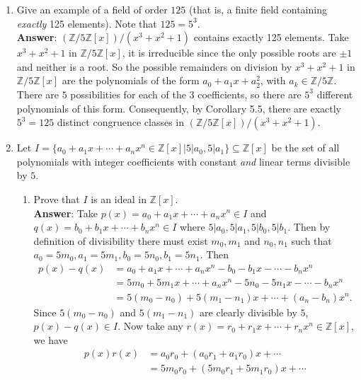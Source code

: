 \documentclass{article}
\begin{document}
\begin{enumerate}
\begin{enumerate}
            \end{enumerate}
      \item Give an example of a field of order $125$ (that is, a finite field containing \textit{exactly} 125 elements). Note that $125=5^3$.\\
            \textbf{Answer}: $(\mathbb{Z}/5\mathbb{Z}[x])/(x^3+x^2+1)$ contains exactly 125 elements. Take $x^3+x^2+1$ in $\mathbb{Z}/5\mathbb{Z}[x]$, it is irreducible since the only possible roots are $\pm 1$ and neither is a root. So the possible remainders on division by $x^3+x^2+1$ in $\mathbb{Z}/5\mathbb{Z}[x]$ are the polynomials of the form $a_0+a_1x+a_2^2$, with $a_k\in\mathbb{Z}/5\mathbb{Z}$. There are $5$ possibilities for each of the $3$ coefficients, so there are $5^3$ different polynomials of this form. Consequently, by Corollary 5.5, there are exactly $5^3=125$ distinct congruence classes in $(\mathbb{Z}/5\mathbb{Z}[x])/(x^3+x^2+1)$.
      \item Let $I=\bigg\{a_0+a_1x+\cdots+a_nx^n\in\mathbb{Z}[x]\bigg| 5|a_0,5|a_1\bigg\}\subseteq\mathbb{Z}[x]$ be the set of all polynomials with integer coefficients with constant \textit{and} linear terms divisible by $5$.
            \begin{enumerate}
                  \item Prove that $I$ is an ideal in $\mathbb{Z}[x]$.\\
                        \textbf{Answer}: Take $p(x)=a_0+a_1x+\cdots+a_nx^n\in I$ and $q(x)=b_0+b_1x+\cdots+b_nx^n\in I$ where $5|a_0,5|a_1,5|b_0,5|b_1$. Then by definition of divisibility there must exist $m_0,m_1$ and $n_0,n_1$ such that $a_0=5m_0,a_1=5m_1,b_0=5n_0,b_1=5n_1$. Then \begin{align*}
                              p(x)-q(x) & =a_0+a_1x+\cdots+a_nx^n-b_0-b_1x-\cdots-b_nx^n     \\
                                        & =5m_0+5m_1x+\cdots+a_nx^n-5n_0-5n_1x-\cdots-b_nx^n \\
                                        & =5(m_0-n_0)+5(m_1-n_1)x+\cdots+(a_n-b_n)x^n.
                        \end{align*}
                        Since $5(m_0-n_0)$ and $5(m_1-n_1)$ are clearly divisible by $5$, $p(x)-q(x)\in I$. Now take any $r(x)=r_0+r_1x+\cdots+r_nx^n\in\mathbb{Z}[x]$, we have \begin{align*}
                              p(x)r(x) & =a_0r_0+(a_0r_1+a_1r_0)x+\cdots    \\
                                       & =5m_0r_0+(5m_0r_1+5m_1r_0)x+\cdots \\

\end{align*}
\end{enumerate}
\end{enumerate}
\end{document}
